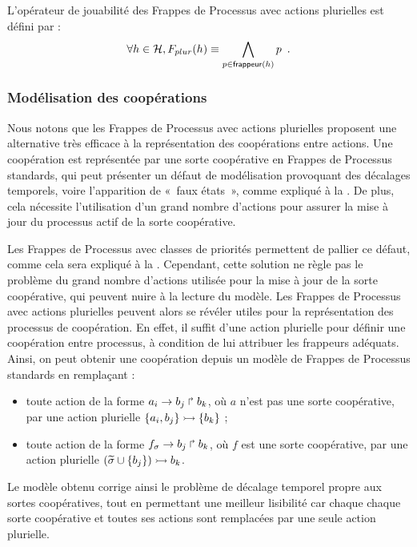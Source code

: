 \begin{definition}
  L'opérateur de jouabilité des Frappes de Processus avec actions plurielles est défini par :
  \[\forall h \in \mathcal{H}, F_{plur}(h) \equiv \bigwedge_{p \in \mathsf{frappeur}(h)} p \enspace.\]
\end{definition}


\subsubsection*{Modélisation des coopérations}

Nous notons que les Frappes de Processus avec actions plurielles proposent une alternative
très efficace à la représentation des coopérations entre actions.
Une coopération est représentée par une sorte coopérative en Frappes de Processus
standards,
qui peut présenter un défaut de modélisation provoquant des décalages
temporels, voire l'apparition de «~faux états~»,
comme expliqué à la .
De plus, cela nécessite l'utilisation d'un grand nombre d'actions pour assurer la mise à jour
du processus actif de la sorte coopérative.

\label{ph2phm}
Les Frappes de Processus avec classes de priorités permettent de pallier ce défaut,
comme cela sera expliqué à la .
Cependant, cette solution ne règle pas le problème du grand nombre d'actions
utilisée pour la mise à jour de la sorte coopérative,
qui peuvent nuire à la lecture du modèle.
Les Frappes de Processus avec actions plurielles peuvent alors se révéler utiles
pour la représentation des processus de coopération.
En effet, il suffit d'une action plurielle pour définir une coopération entre processus,
à condition de lui attribuer les frappeurs adéquats.
Ainsi, on peut obtenir une coopération depuis un modèle de Frappes de Processus standards
en remplaçant :
\begin{itemize}
  \item toute action de la forme $a_i\rightarrow b_j\Rsh b_k$,
    où $a$ n'est pas une sorte coopérative, par
    une action plurielle $\mbox{$\{a_i, b_j\} \rightarrowtail \{b_k\}$}$ ;
  \item toute action de la forme $f_{\sigma}\rightarrow b_j\Rsh b_k$,
    où $f$ est une sorte coopérative, par
    une action plurielle $\mbox{$(\widetilde{\sigma} \cup \{ b_j \}) \rightarrowtail b_k$}$.
\end{itemize}
Le modèle obtenu corrige ainsi le problème de décalage temporel propre aux sortes
coopératives, tout en permettant une meilleur lisibilité
car chaque chaque sorte coopérative et toutes ses actions sont remplacées par
une seule action plurielle.

